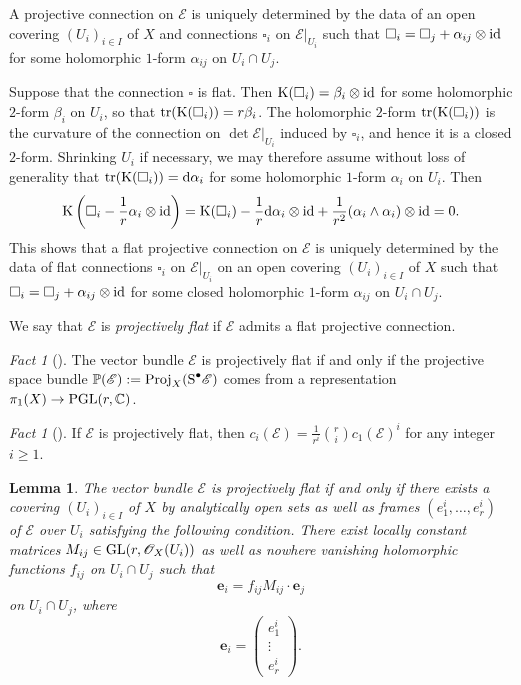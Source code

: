 \documentclass[english,10pt]{amsart}
\renewcommand{\ge}{\geqslant}
\newcommand{\sE}{\mathscr{E}}
\newcommand{\sO}{\mathscr{O}}
\newcommand{\dd}{\textup{d}}
\newtheorem{lemma}[thm]{Lemma}
\theoremstyle{definition}
\theoremstyle{remark}
\newtheorem{fact}[thm]{Fact}
\numberwithin{equation}{section}
\begin{document}
\medskip

A projective connection on $\sE$ is uniquely determined by the data of an open covering $(U_i)_{i\in I}$ of $X$ and connections $\square_i$ on $\sE|_{U_i}$ such that $\square_i=\square_j+\alpha_{ij}\otimes \textup{id}$ for some holomorphic $1$-form $\alpha_{ij}$ on $U_i\cap U_j$.

\medskip

Suppose that the connection $\square$ is flat. Then $\textup{K}(\square_i)=\beta_i \otimes \textup{id}$ for some holomorphic $2$-form $\beta_i$ on $U_i$, so that $\textup{tr}(\textup{K}(\square_i))=r \beta_i$. The holomorphic $2$-form $\textup{tr}(\textup{K}(\square_i))$ is the curvature of the connection on $\det \sE|_{U_i}$ induced by $\square_i$, and hence it is a closed $2$-form. Shrinking $U_i$ if necessary, we may therefore assume without loss of generality that $\textup{tr}(\textup{K}(\square_i))=\dd \alpha_i$ for some holomorphic $1$-form $\alpha_i$ on $U_i$.
Then 
\[
\textup{K}\left(\square_i-\frac{1}{r}\alpha_i\otimes \textup{id}\right)=\textup{K}(\square_i)-\frac{1}{r}\dd \alpha_i \otimes \textup{id}+\frac{1}{r^2}(\alpha_i\wedge \alpha_i)\otimes \textup{id}=0. 
\]
This shows that a flat projective connection on $\sE$ is uniquely determined by the data of flat connections $\square_i$ on $\sE|_{U_i}$ on an open covering $(U_i)_{i\in I}$ of $X$ such that $\square_i=\square_j+\alpha_{ij}\otimes \textup{id}$ for some closed holomorphic $1$-form $\alpha_{ij}$ on $U_i\cap U_j$. 

\medskip

We say that $\sE$ is \emph{projectively flat} if $\sE$ admits a flat projective connection.

\begin{fact}[{\cite[Corollary I.2.7]{kobayashi_diff_geom_vb}}]
The vector bundle $\sE$ is projectively flat if and only if the projective space bundle 
$\mathbb{P}(\sE):=\textup{Proj}_X(\textup{S}^\bullet\sE)$ comes from a representation $\pi_1(X) \to \textup{PGL}(r,\mathbb{C})$. 
\end{fact}

\begin{fact}[{\cite[Proposition II.3.1(b)]{kobayashi_diff_geom_vb}}]\label{fact:chern_classes}
If $\sE$ is projectively flat, then $c_i(\sE)=\frac{1}{r^i}\binom{r}{i}c_1(\sE)^i$ for any integer $i \ge 1$. 
\end{fact}

\begin{lemma}\label{lemma:proj_flat_frames}
The vector bundle $\sE$ is projectively flat if and only if there exists a covering $(U_i)_{i \in I}$ of $X$ by analytically open sets as well as frames $(e_1^i,\ldots,e_r^i)$ of $\sE$ over $U_i$ satisfying the following condition. There exist locally constant matrices $M_{ij} \in \textup{GL}(r,\sO_X(U_i))$ as well as nowhere vanishing holomorphic functions $f_{ij}$ on $U_i\cap U_j$ such that 
\[
\textbf{e}_i= f_{ij} M_{ij} \cdot \textbf{e}_j
\]
on $U_i \cap U_j$, where 
\[
\textbf{e}_i = 
\begin{pmatrix}
e_1^i \\
\vdots \\
e_r^i
\end{pmatrix}
.
\]
\end{lemma}
\end{document}
